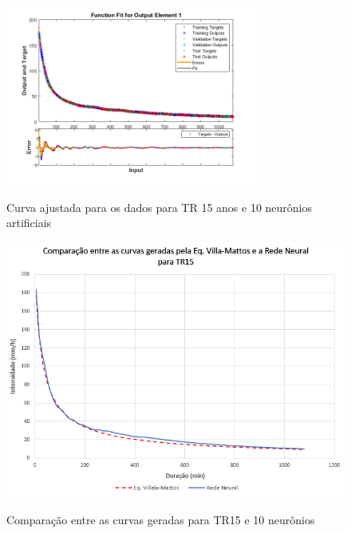 \begin{figure}[H]
    \caption{Curva ajustada para os dados para TR 15 anos e 10 neurônios artificiais}
    \centering
    \includegraphics[width=0.74\textwidth]{Textuais/Figuras/NN/tr15-10neuronio.png}
    \label{fig:tr15-10n}
\end{figure}

\begin{figure}[H]
    \caption{Comparação entre as curvas geradas para TR15 e 10 neurônios}
    \centering
    \includegraphics[width=\textwidth]{Textuais/Resultados/Comparacao/TR15.png}
    \label{fig:comp-tr15}
\end{figure}